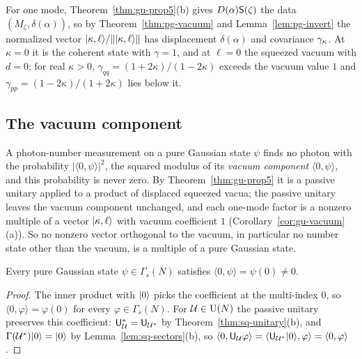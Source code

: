 \begin{veteenv}
For one mode, Theorem~\ref{thm:gu-prop5}(b) gives $D(\alpha)\mathsf S(\zeta)$ the data $(M_\zeta,\delta(\alpha))$, so by Theorem~\ref{thm:pg-vacuum} and
Lemma~\ref{lem:pg-invert} the normalized vector $\lvert \kappa,\ell\rangle/\lVert\lvert \kappa,\ell\rangle\rVert$ has displacement $\delta(\alpha)$ and covariance
$\gamma_\kappa$. At $\kappa=0$ it is the coherent state with $\gamma=1$, and at $\ell=0$ the squeezed vacuum with $d=0$; for real $\kappa>0$,
$\gamma_{qq}=(1+2\kappa)/(1-2\kappa)$ exceeds the vacuum value $1$ and $\gamma_{pp}=(1-2\kappa)/(1+2\kappa)$ lies below it.

\begin{vetyenv}
\subsection{The vacuum component}\label{sec:pg-vacuumcomp}

A photon-number measurement on a pure Gaussian state $\psi$ finds no photon with the probability
$\lvert\langle0,\psi\rangle\rvert^2$, the squared modulus of its \emph{vacuum component} $\langle0,\psi\rangle$, and this probability
is never zero. By
Theorem~\ref{thm:gu-prop5} it is a passive unitary applied to a product of displaced squeezed vacua; the passive unitary
leaves the vacuum component unchanged, and each one-mode factor is a nonzero multiple of a vector $\lvert \kappa,\ell\rangle$ with
vacuum coefficient $1$ (Corollary~\ref{cor:gu-vacuum}(a)). So no nonzero vector orthogonal to the vacuum, in particular no
number state other than the vacuum, is a multiple of a pure Gaussian state.

\begin{theorem}\label{thm:pg-vacuumcomp}
Every pure Gaussian state $\psi\in\Gamma_s(N)$ satisfies $\langle0,\psi\rangle=\psi(0)\ne0$.
\end{theorem}

\begin{proof}
The inner product with $\lvert 0\rangle$ picks the coefficient at the multi-index $0$, so $\langle0,\varphi\rangle=\varphi(0)$ for every
$\varphi\in\Gamma_s(N)$. For $\mathcal U\in\mathrm{U}(N)$ the passive unitary preserves this coefficient: $\mathsf U_\mathcal U^*=\mathsf U_{\mathcal U^*}$ by
Theorem~\ref{thm:sq-unitary}(b), and $\Gamma(\mathcal U^*)\lvert 0\rangle=\lvert 0\rangle$ by Lemma~\ref{lem:sq-sectors}(b), so
$\langle0,\mathsf U_\mathcal U\varphi\rangle=\langle\mathsf U_{\mathcal U^*}\lvert 0\rangle,\varphi\rangle=\langle0,\varphi\rangle$.


\end{proof}
\end{vetyenv}
\end{veteenv}
